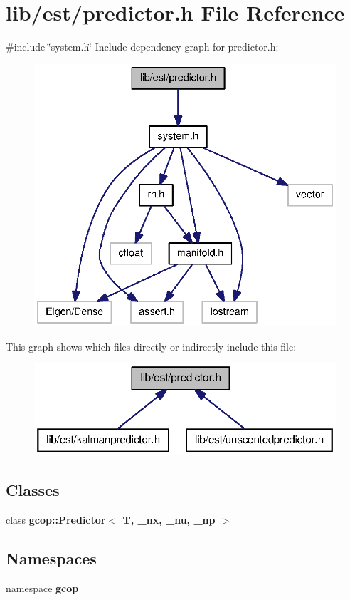 \section{lib/est/predictor.h \-File \-Reference}
\label{predictor_8h}
{\ttfamily \#include \char`\"{}system.\-h\char`\"{}}\*
\-Include dependency graph for predictor.\-h\-:\nopagebreak
\begin{figure}[H]
\begin{center}
\leavevmode
\includegraphics[width=336pt]{predictor_8h__incl}
\end{center}
\end{figure}
\-This graph shows which files directly or indirectly include this file\-:\nopagebreak
\begin{figure}[H]
\begin{center}
\leavevmode
\includegraphics[width=320pt]{predictor_8h__dep__incl}
\end{center}
\end{figure}
\subsection*{\-Classes}
\begin{DoxyCompactItemize}
\item 
class {\bf gcop\-::\-Predictor$<$ T, \-\_\-nx, \-\_\-nu, \-\_\-np $>$}
\end{DoxyCompactItemize}
\subsection*{\-Namespaces}
\begin{DoxyCompactItemize}
\item 
namespace {\bf gcop}
\end{DoxyCompactItemize}
